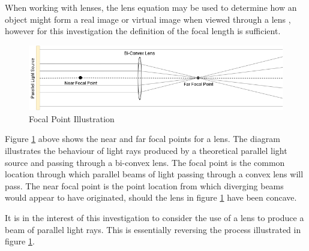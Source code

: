 When working with lenses, the lens equation may be used to determine how an object might form a real image or virtual image when viewed through a lens \cite{Knight2013}, however for this investigation the definition of the focal length is sufficient.

\begin{figure}[H]
	\centering
	\includegraphics[width=0.8\linewidth]{figures/litreview/lens_diagram.png}
	\caption{Focal Point Illustration}
	\label{fig:lens_diagram}
\end{figure}

Figure \ref{fig:lens_diagram} above shows the near and far focal points for a lens. The diagram illustrates the behaviour of light rays produced by a theoretical parallel light source and passing through a bi-convex lens. The focal point is the common location through which parallel beams of light passing through a convex lens will pass. The near focal point is the point location from which diverging beams would appear to have originated, should the lens in figure \ref{fig:lens_diagram} have been concave.

It is in the interest of this investigation to consider the use of a lens to produce a beam of parallel light rays. This is essentially reversing the process illustrated in figure \ref{fig:lens_diagram}.

